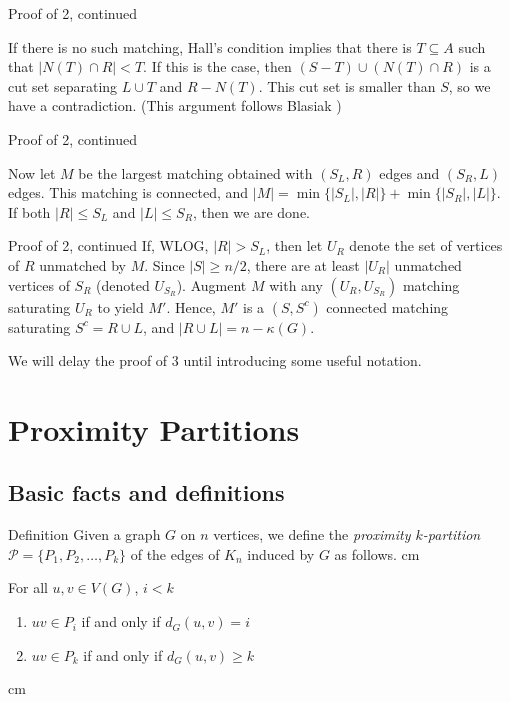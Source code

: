 \documentclass{beamer}
\newcommand{\bframe}[2]{\begin{frame}{#1}#2\end{frame}}
\begin{document}
\bframe{Proof of 2, continued}{

If there is no such matching, Hall's condition implies that there is $T \subseteq A$ such that $|N(T) \cap R| < T$.  \pause If this is the case, then $(S-T ) \cup (N(T) \cap R)$ is a cut set separating $L\cup T$ and $R-N(T)$. \pause This cut set is smaller than $S$, so we have a contradiction. \pause (This argument follows Blasiak \cite{blas})

}

\bframe{Proof of 2, continued}{

Now let $M$ be the largest matching obtained with $(S_L,R)$ edges and $(S_R,L)$ edges.  \pause 
This matching is connected, and $|M| = \min\{|S_L|, |R|\} + \min\{|S_R|, |L|\}$. \pause 
If both $|R| \leq S_L$ and $|L| \leq S_R$, then we are done.  
}

\bframe{Proof of 2, continued}{
If, WLOG,  $|R| > S_L$, then let $U_R$ denote the set of vertices of $R$ unmatched by $M$. \pause
 Since $|S|\geq n/2$, there are at least $|U_R|$ unmatched vertices of $S_R$ (denoted $U_{S_R}$).\pause
  Augment $M$ with any $(U_R , U_{S_R})$ matching saturating $U_R$ to yield $M'$. \pause
 Hence, $M'$ is a $(S,S^c)$ connected matching saturating $S^c = R\cup L$, and $|R\cup L| = n-\kappa(G)$. 
}

\bframe{}{
We will delay the proof of 3 until introducing some useful notation.
}

\section{Proximity Partitions}

\subsection{Basic facts and definitions}

\bframe{Definition}{
	Given a graph $G$ on $n$ vertices, we define the \textit{proximity $k$-partition} $\mathcal{P} = \{P_1, P_2, \ldots, P_k\}$ of the edges of $K_n$ induced by $G$ as follows.\pause\vskip 0.5 cm

	For all $u,v \in V(G)$, $i < k$
 	\begin{enumerate}
  		\item $uv \in P_i$ if and only if $d_G(u,v) = i$\pause
  		\item $uv \in P_k$ if and only if $d_G(u,v) \geq k$\pause
 	\end{enumerate}
	\vskip 0.5 cm
	\begin{center}\pause\quad \end{center}}
\end{document}
